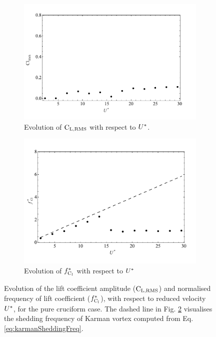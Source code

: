 \documentclass[oneside]{utmthesis}
\begin{document}
\begin{figure}
  \centering
  \begin{subfigure}[h]{1\textwidth}
    \includegraphics[width=\textwidth]{figs/clRMS5}
    \caption{Evolution of $\text{C}_{\text{L,RMS}}$ with respect to $U^{*}$.}
    \label{fig:clRMS5}
  \end{subfigure}

  \begin{subfigure}[h]{0.95\textwidth}
    \includegraphics[width=\textwidth]{figs/clFreq5}
    \caption{Evolution of $f_{\text{C}_{l}}^{*}$ with respect to $U^{*}$}
    \label{fig:clFreq5}
  \end{subfigure}

  \caption{Evolution of the lift coefficient \rms{} amplitude ($\text{C}_{\text{L,RMS}}$) and normalised frequency of lift coefficient ($f_{\text{C}_{l}}^{*}$), with respect to reduced velocity $U^{*}$, for the pure cruciform case. The dashed line in Fig. \ref{fig:clFreq5} visualises the shedding frequency of Karman vortex computed from Eq. \ref{eq:karmanSheddingFreq}.} \label{fig:cl90}
\end{figure}
\end{document}
